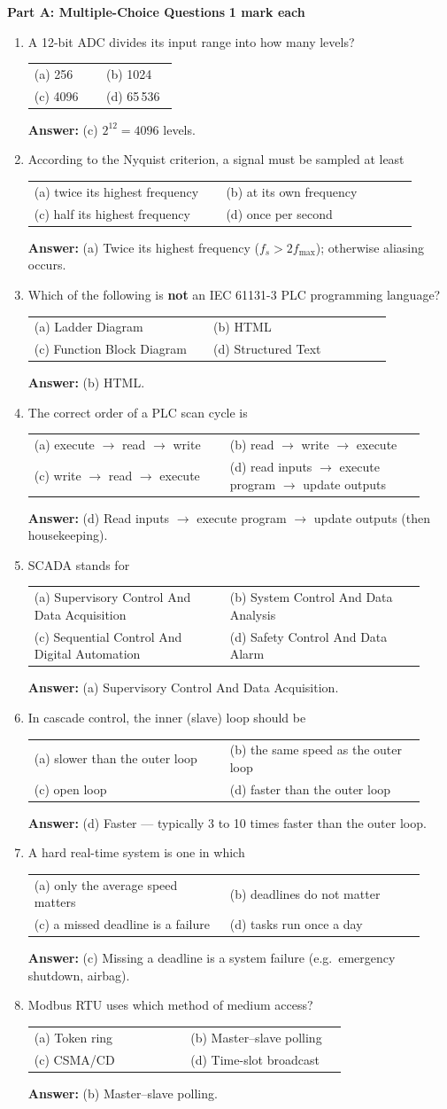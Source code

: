 \documentclass[11pt,a4paper]{article}
\makeatletter
\newcommand{\opts}[4]{%
	\par\smallskip
	\begin{tabular}{@{}p{0.46\linewidth}p{0.46\linewidth}@{}}
		(a) #1 & (b) #2 \\
		(c) #3 & (d) #4 \\
	\end{tabular}\par}
\newcommand{\ans}[1]{%
	\par\smallskip
	{\color{cGreen!50!black}\textbf{Answer:} #1}\par\medskip}
\newcommand{\partheading}[2]{%
	\bigskip
	\begin{tcolorbox}[colback=cAccent!10, colframe=cAccent, boxrule=0.6pt, arc=2pt, left=6pt, top=3pt, bottom=3pt]
		\textbf{\large #1} \hfill \textbf{#2}
	\end{tcolorbox}}
\makeatother
\begin{document}
	\partheading{Part A: Multiple-Choice Questions}{1 mark each}
	\begin{enumerate}

		\item A 12-bit ADC divides its input range into how many levels?
		\opts{256}{1024}{4096}{65\,536}
		\ans{(c) $2^{12} = 4096$ levels.}

		\item According to the Nyquist criterion, a signal must be sampled at least
		\opts{twice its highest frequency}{at its own frequency}{half its highest frequency}{once per second}
		\ans{(a) Twice its highest frequency ($f_s > 2f_{\max}$); otherwise aliasing occurs.}

		\item Which of the following is \textbf{not} an IEC 61131-3 PLC programming language?
		\opts{Ladder Diagram}{HTML}{Function Block Diagram}{Structured Text}
		\ans{(b) HTML.}

		\item The correct order of a PLC scan cycle is
		\opts{execute $\rightarrow$ read $\rightarrow$ write}{read $\rightarrow$ write $\rightarrow$ execute}{write $\rightarrow$ read $\rightarrow$ execute}{read inputs $\rightarrow$ execute program $\rightarrow$ update outputs}
		\ans{(d) Read inputs $\rightarrow$ execute program $\rightarrow$ update outputs (then housekeeping).}

		\item SCADA stands for
		\opts{Supervisory Control And Data Acquisition}{System Control And Data Analysis}{Sequential Control And Digital Automation}{Safety Control And Data Alarm}
		\ans{(a) Supervisory Control And Data Acquisition.}

		\item In cascade control, the inner (slave) loop should be
		\opts{slower than the outer loop}{the same speed as the outer loop}{open loop}{faster than the outer loop}
		\ans{(d) Faster --- typically 3 to 10 times faster than the outer loop.}

		\item A hard real-time system is one in which
		\opts{only the average speed matters}{deadlines do not matter}{a missed deadline is a failure}{tasks run once a day}
		\ans{(c) Missing a deadline is a system failure (e.g.\ emergency shutdown, airbag).}

		\item Modbus RTU uses which method of medium access?
		\opts{Token ring}{Master--slave polling}{CSMA/CD}{Time-slot broadcast}
		\ans{(b) Master--slave polling.}


\end{enumerate}
\end{document}
